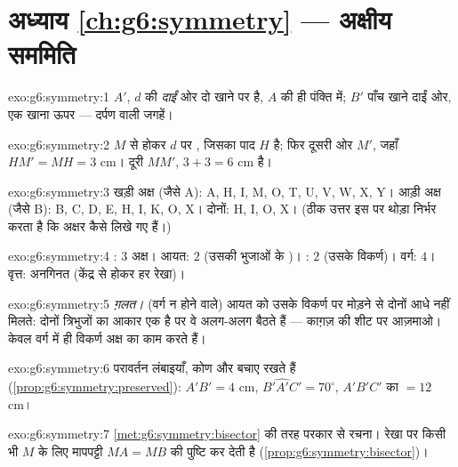 \section*{अध्याय \ref{ch:g6:symmetry} --- अक्षीय सममिति}

\begin{solution}{exo:g6:symmetry:1}
$A'$, $d$ की \emph{दाईं} ओर दो खाने पर है, $A$ की ही पंक्ति में;
$B'$ पाँच खाने दाईं ओर, एक खाना ऊपर --- दर्पण वाली
जगहें।
\end{solution}

\begin{solution}{exo:g6:symmetry:2}
$M$ से होकर $d$ पर , जिसका पाद $H$ है; फिर दूसरी ओर $M'$,
जहाँ $HM' = MH = 3$ cm। दूरी $MM'$,
$3 + 3 = 6$ cm है।
\end{solution}

\begin{solution}{exo:g6:symmetry:3}
खड़ी अक्ष (जैसे A): A, H, I, M, O, T, U, V, W, X, Y।
आड़ी अक्ष (जैसे B): B, C, D, E, H, I, K, O, X।
दोनों: H, I, O, X।
(ठीक उत्तर इस पर थोड़ा निर्भर करता है कि अक्षर कैसे लिखे गए हैं।)
\end{solution}

\begin{solution}{exo:g6:symmetry:4}
: $3$ अक्ष। आयत: $2$ (उसकी भुजाओं के )। : $2$ (उसके विकर्ण)। वर्ग: $4$।
वृत्त: अनगिनत (केंद्र से होकर हर रेखा)।
\end{solution}

\begin{solution}{exo:g6:symmetry:5}
\emph{ग़लत।} (वर्ग न होने वाले) आयत को उसके विकर्ण पर मोड़ने से
दोनों आधे नहीं मिलते: दोनों त्रिभुजों का आकार एक है पर वे अलग-अलग
बैठते हैं --- काग़ज़ की शीट पर आज़माओ। केवल वर्ग में ही विकर्ण
अक्ष का काम करते हैं।
\end{solution}

\begin{solution}{exo:g6:symmetry:6}
परावर्तन लंबाइयाँ, कोण और  बचाए रखते हैं
(\cref{prop:g6:symmetry:preserved}): $A'B' = 4$ cm,
$\widehat{B'A'C'} = 70^\circ$, $A'B'C'$ का  $= 12$ cm।
\end{solution}

\begin{solution}{exo:g6:symmetry:7}
\cref{met:g6:symmetry:bisector} की तरह परकार से रचना। रेखा पर
किसी भी $M$ के लिए मापपट्टी $MA = MB$ की पुष्टि कर देती है
(\cref{prop:g6:symmetry:bisector})।
\end{solution}

